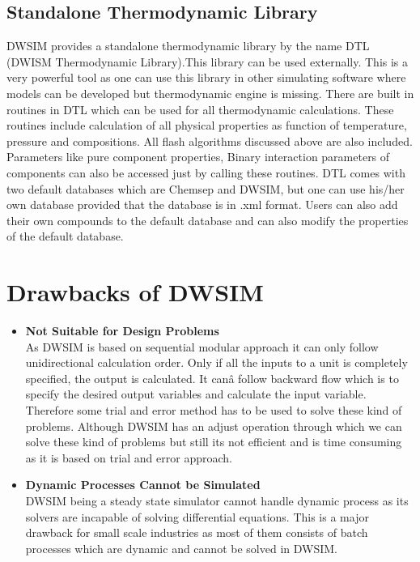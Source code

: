 \documentclass[12pt]{report}
\begin{document}
\subsection{Standalone Thermodynamic Library}
DWSIM provides a standalone thermodynamic library by the name DTL (DWISM Thermodynamic Library).This library can be used externally.
This is a very powerful tool as one can use this library in other simulating software where models can be developed but thermodynamic engine is missing.
There are built in routines in DTL which can be used for all thermodynamic calculations. These routines include calculation of all physical properties as function of temperature, pressure and compositions. All flash algorithms discussed above are also included. Parameters like pure component properties, Binary interaction parameters of components can also be accessed just by calling these routines.
DTL comes with two default databases which are Chemsep and DWSIM, but one can use his/her own database provided that the database is in .xml format. Users can also add their own compounds to the default database and can also modify the properties of the default database.

\section{Drawbacks of DWSIM}
\begin{itemize}
\item {\textbf{Not Suitable for Design Problems}} \\
As DWSIM is based on sequential modular approach it can only follow unidirectional calculation order. Only if all the inputs to a unit is completely specified, the output is calculated. It canâ  follow backward flow which is to specify the desired output variables and calculate the input variable. Therefore some trial and error method has to be used to solve these kind of problems. Although DWSIM has an adjust operation through which we can solve these kind of problems but still its not efficient and is time consuming as it is based on trial and error approach.

\item{\textbf{Dynamic Processes Cannot be Simulated}} \\
DWSIM being a steady state simulator cannot handle dynamic process as its solvers are incapable of solving differential equations. This is a major drawback for small scale industries as most of them consists of batch processes which are dynamic and cannot be solved in DWSIM.

\end{itemize}
\end{document}
